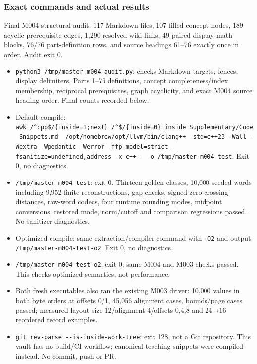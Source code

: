 \subsubsection{Exact commands and actual results}\label{appendix-a103e7846d21-exact-commands-and-actual-results}

Final M004 structural audit: 117 Markdown files, 107 filled concept nodes, 189 acyclic prerequisite edges, 1,290 resolved wiki links, 49 paired display-math blocks, 76/76 part-definition rows, and source headings 61--76 exactly once in order. Audit exit 0.

\begin{itemize}
\tightlist
\item
  \texttt{python3\ /tmp/master-m004-audit.py}: checks Markdown targets, fences, display delimiters, Parts 1--76 definitions, concept completeness/index membership, reciprocal prerequisites, graph acyclicity, and exact M004 source heading order. Final counts recorded below.
\item
  Default compile: \texttt{awk\ \textquotesingle{}/\^{}\textasciigrave{}\textasciigrave{}\textasciigrave{}cpp\$/\{inside=1;next\}\ /\^{}\textasciigrave{}\textasciigrave{}\textasciigrave{}\$/\{inside=0\}\ inside\textquotesingle{}\ \textquotesingle{}Supplementary/Code\ Snippets.md\textquotesingle{}\ \textbar{}\ /opt/homebrew/opt/llvm/bin/clang++\ -std=c++23\ -Wall\ -Wextra\ -Wpedantic\ -Werror\ -ffp-model=strict\ -fsanitize=undefined,address\ -x\ c++\ -\ -o\ /tmp/master-m004-test}. Exit 0, no diagnostics.
\item
  \texttt{/tmp/master-m004-test}: exit 0. Thirteen golden classes, 10,000 seeded words including 9,952 finite reconstructions, gap checks, signed-zero-crossing distances, raw-word codecs, four runtime rounding modes, midpoint conversions, restored mode, norm/cutoff and comparison regressions passed. No sanitizer diagnostics.
\item
  Optimized compile: same extraction/compiler command with \texttt{-O2} and output \texttt{/tmp/master-m004-test-o2}. Exit 0, no diagnostics.
\item
  \texttt{/tmp/master-m004-test-o2}: exit 0; same M004 and M003 checks passed. This checks optimized semantics, not performance.
\item
  Both fresh executables also ran the existing M003 driver: 10,000 values in both byte orders at offsets 0/1, 45,056 alignment cases, bounds/page cases passed; measured layout size 12/alignment 4/offsets 0,4,8 and 24→16 reordered record examples.
\item
  \texttt{git\ rev-parse\ -\/-is-inside-work-tree}: exit 128, not a Git repository. This vault has no build/CI workflow; canonical teaching snippets were compiled instead. No commit, push or PR.
\end{itemize}

